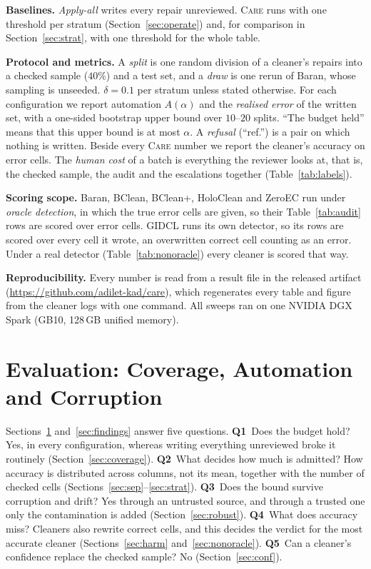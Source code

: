 \documentclass[sigconf, nonacm, balance=false]{acmart}
\theoremstyle{remark}
\newcommand{\artifacturl}{https://github.com/adilet-kad/care}
\begin{document}
\textbf{Baselines.} \emph{Apply-all} writes every repair unreviewed. \textsc{Care}
runs with one threshold per stratum (Section~\ref{sec:operate}) and, for comparison in
Section~\ref{sec:strat}, with one threshold for the whole table.

\textbf{Protocol and metrics.} A \emph{split} is one random division of a cleaner's
repairs into a checked sample ($40\%$) and a test set, and a \emph{draw} is one rerun
of Baran, whose sampling is unseeded. $\delta=0.1$ per stratum unless stated otherwise. For each
configuration we report automation $A(\alpha)$ and the \emph{realised error} of the
written set, with a one-sided bootstrap upper bound over $10$--$20$ splits. ``The
budget held'' means that this upper bound is at most $\alpha$. A \emph{refusal}
(``ref.'') is a pair on which nothing is written. Beside every \textsc{Care} number we
report the cleaner's accuracy on error cells. The \emph{human cost} of a batch is
everything the reviewer looks at, that is, the checked sample, the audit and the
escalations together (Table~\ref{tab:labels}).

\textbf{Scoring scope.} Baran, BClean, BClean+, HoloClean and ZeroEC run under
\emph{oracle detection}, in which the true error cells are given, so their
Table~\ref{tab:audit} rows are scored over error cells. GIDCL runs its own detector, so
its rows are scored over every cell it wrote, an overwritten correct cell counting as
an error. Under a real detector (Table~\ref{tab:nonoracle}) every cleaner is scored
that way.


\textbf{Reproducibility.} Every number is read from a result file in the released
artifact (\url{\artifacturl}), which regenerates every table and figure from the cleaner
logs with one command. All sweeps ran on one NVIDIA DGX Spark (GB10, 128\,GB unified memory).

\section{Evaluation: Coverage, Automation and Corruption}
\label{sec:results}

Sections~\ref{sec:results} and~\ref{sec:findings} answer five questions.
\textbf{Q1}~Does the budget hold? Yes, in every configuration, whereas writing
everything unreviewed broke it routinely (Section~\ref{sec:coverage}).
\textbf{Q2}~What decides how much is admitted? How accuracy is distributed across
columns, not its mean, together with the number of checked cells
(Sections~\ref{sec:sep}--\ref{sec:strat}).
\textbf{Q3}~Does the bound survive corruption and drift? Yes through an untrusted
source, and through a trusted one only the contamination is added
(Section~\ref{sec:robust}).
\textbf{Q4}~What does accuracy miss? Cleaners also rewrite correct cells, and this
decides the verdict for the most accurate cleaner (Sections~\ref{sec:harm}
and~\ref{sec:nonoracle}).
\textbf{Q5}~Can a cleaner's confidence replace the checked sample? No
(Section~\ref{sec:conf}).
\end{document}
